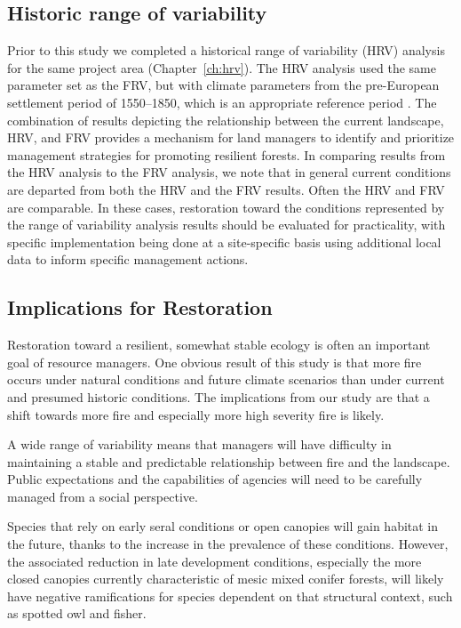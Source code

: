 \subsection{Historic range of variability}
Prior to this study we completed a historical range of variability (HRV) analysis for the same project area (Chapter~\ref{ch:hrv}). The HRV analysis used the same parameter set as the FRV, but with climate parameters from the pre-European settlement period of 1550--1850, which is an appropriate reference period \citep{Safford2013}. The combination of results depicting the relationship between the current landscape, HRV, and FRV provides a mechanism for land managers to identify and prioritize management strategies for promoting resilient forests. In comparing results from the HRV analysis to the FRV analysis, we note that in general current conditions are departed from both the HRV and the FRV results. Often the HRV and FRV are comparable. In these cases, restoration toward the conditions represented by the range of variability analysis results should be evaluated for practicality, with specific implementation being done at a site-specific basis using additional local data to inform specific management actions.

\subsection{Implications for Restoration}

Restoration toward a resilient, somewhat stable ecology is often an important goal of resource managers. One obvious result of this study is that more fire occurs under natural conditions and future climate scenarios than under current and presumed historic conditions. The implications from our study are that a shift towards more fire and especially more high severity fire is likely.

A wide range of variability means that managers will have difficulty in maintaining a stable and predictable relationship between fire and the landscape. Public expectations and the capabilities of agencies will need to be carefully managed from a social perspective.

Species that rely on early seral conditions or open canopies will gain habitat in the future, thanks to the increase in the prevalence of these conditions. However, the associated reduction in late development conditions, especially the more closed canopies currently characteristic of mesic mixed conifer forests, will likely have negative ramifications for species dependent on that structural context, such as spotted owl and fisher.

